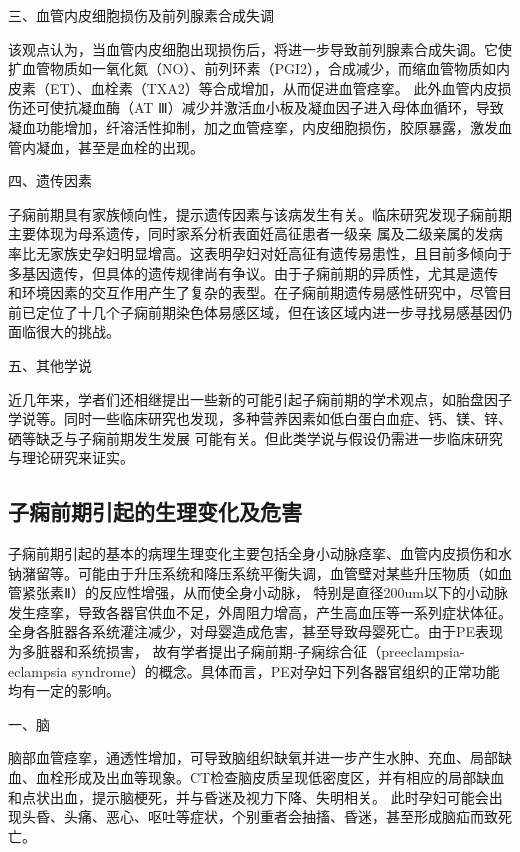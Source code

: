 三、血管内皮细胞损伤及前列腺素合成失调

该观点认为，当血管内皮细胞出现损伤后，将进一步导致前列腺素合成失调\cite{OAG9,Sibai2005}。它使扩血管物质如一氧化氮（NO）、前列环素（PGI2），合成减少，而缩血管物质如内皮素（ET）、血栓素（TXA2）等合成增加，从而促进血管痉挛。
此外血管内皮损伤还可使抗凝血酶（AT Ⅲ）减少并激活血小板及凝血因子进入母体血循环，导致凝血功能增加，纤溶活性抑制，加之血管痉挛，内皮细胞损伤，胶原暴露，激发血管内凝血，甚至是血栓的出现。

四、遗传因素

子痫前期具有家族倾向性，提示遗传因素与该病发生有关\cite{OAG9,Sibai2005}。临床研究发现子痫前期主要体现为母系遗传，同时家系分析表面妊高征患者一级亲
属及二级亲属的发病率比无家族史孕妇明显增高\cite{Ge2013}。这表明孕妇对妊高征有遗传易患性，且目前多倾向于多基因遗传，但具体的遗传规律尚有争议。由于子痫前期的异质性，尤其是遗传
和环境因素的交互作用产生了复杂的表型。在子痫前期遗传易感性研究中，尽管目前已定位了十几个子痫前期染色体易感区域，但在该区域内进一步寻找易感基因仍面临很大的挑战。

五、其他学说

近几年来，学者们还相继提出一些新的可能引起子痫前期的学术观点，如胎盘因子学说\cite{Shi2006}等。同时一些临床研究也发现，多种营养因素如低白蛋白血症、钙、镁、锌、硒等缺乏与子痫前期发生发展
可能有关\cite{OAG9}。但此类学说与假设仍需进一步临床研究与理论研究来证实。

\subsection{子痫前期引起的生理变化及危害}
子痫前期引起的基本的病理生理变化主要包括全身小动脉痉挛、血管内皮损伤和水钠潴留等。可能由于升压系统和降压系统平衡失调，血管壁对某些升压物质（如血管紧张素Ⅱ）的反应性增强，从而使全身小动脉，
特别是直径200um以下的小动脉发生痉挛，导致各器官供血不足，外周阻力增高，产生高血压等一系列症状体征。全身各脏器各系统灌注减少，对母婴造成危害，甚至导致母婴死亡。由于PE表现为多脏器和系统损害，
故有学者提出子痫前期-子痫综合征（preeclampsia-eclampsia syndrome）的概念\cite{a_hospital,OAG9}。具体而言，PE对孕妇下列各器官组织的正常功能均有一定的影响。

一、脑

脑部血管痉挛，通透性增加，可导致脑组织缺氧并进一步产生水肿、充血、局部缺血、血栓形成及出血等现象。CT检查脑皮质呈现低密度区，并有相应的局部缺血和点状出血，提示脑梗死，并与昏迷及视力下降、失明相关。
此时孕妇可能会出现头昏、头痛、恶心、呕吐等症状，个别重者会抽搐、昏迷，甚至形成脑疝而致死亡。

